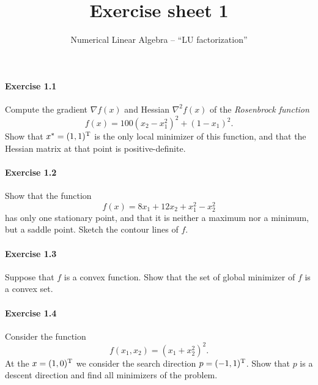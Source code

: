 
\subtitle{Numerical Linear Algebra -- ``LU factorization''}
\title{Exercise sheet 1}
\date{}
\usepackage{amsmath}
\newcommand\tp{\ensuremath{\text{\upshape T}}}

\maketitle

\vspace{-12ex}

\paragraph{Exercise 1.1}
Compute  the gradient $\nabla f(x)$ and Hessian $\nabla^2f(x)$ of the
\emph{Rosenbrock function}
\begin{equation}\label{eq:rosenbrock}
  f(x) = 100(x_2-x_1^2)^2 + (1-x_1)^2.
\end{equation}
Show that $x^*=(1,1)^\tp$ is the only local minimizer of this function, and
that the Hessian matrix at that point is positive-definite.

\paragraph{Exercise 1.2}
Show that the function
\[
  f(x) = 8x_1 + 12x_2 + x_1^2 - x_2^2
\]
has only one stationary point, and that it is neither a maximum nor a minimum,
but a saddle point. Sketch the contour lines of $f$.

\paragraph{Exercise 1.3}
Suppose that $f$ is a convex function. Show that the set of global minimizer
of $f$ is a convex set.

\paragraph{Exercise 1.4}
Consider the function
\[
  f(x_1, x_2) = (x_1+x_2^2)^2.
\]
At the $x=(1,0)^\tp$ we consider the search direction $p=(-1,1)^\tp$. Show
that $p$ is a descent direction and find all minimizers of the problem.

